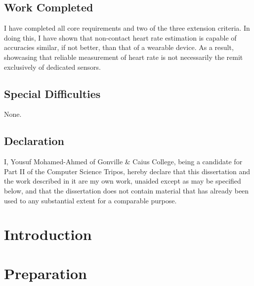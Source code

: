 \documentclass[12pt,twoside,notitlepage]{report}
\begin{document}
\section*{Work Completed}
I have completed all core requirements and two of the three extension criteria. In doing this, I have shown that 
non-contact heart rate estimation is capable of accuracies similar, if not better, than that of a wearable device. 
As a result, showcasing that reliable measurement of heart rate is not necessarily the remit exclusively of dedicated sensors.

\section*{Special Difficulties}
None.
 
\newpage
\section*{Declaration}

I, Yousuf Mohamed-Ahmed of Gonville \& Caius College, being a candidate for Part II of the Computer
Science Tripos, hereby declare
that this dissertation and the work described in it are my own work,
unaided except as may be specified below, and that the dissertation
does not contain material that has already been used to any substantial
extent for a comparable purpose.

\bigskip
{}

\medskip
{}

\cleardoublepage

\tableofcontents

\newpage


\cleardoublepage        %

\setcounter{page}{1}
\pagestyle{headings}

\chapter{Introduction}


\chapter{Preparation}

\end{document}
